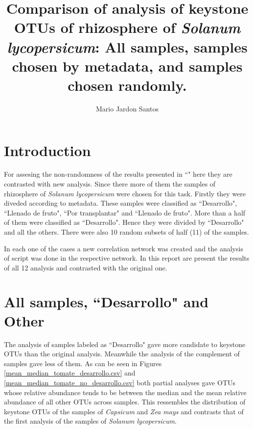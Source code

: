 \documentclass{article}
\title{Comparison of analysis of keystone OTUs of rhizosphere of \textit{Solanum lycopersicum}: All samples, samples chosen by metadata, and samples chosen randomly.}
\author{Mario Jardon Santos}
\date{}
\begin{document}
\maketitle

\section{Introduction}
\label{intro}

For assesing the non-randomness of the results presented in ``" here they are contrasted with new analysis. 
Since there more of them the samples of rhizosphere of \textit{Solanum lycopersicum} were chosen for this task.
Firstly they were diveded according to metadata. 
These samples were classified as ``Desarrollo", ``Llenado de fruto", ``Por transplantar" and ``Llenado de fruto".
More than a half of them were classified as ``Desarrollo".
Hence they were divided by ``Desarrollo" and all the others.
There were also 10 random subsets of half (11) of the samples.

In each one of the cases a new correlation network was created and the analysis of script was done in the respective network. 
In this report are present the results of all 12 analysis and contrasted with the original one.

\section{All samples, ``Desarrollo" and Other}
\label{des_vs_no_des}

The analysis of samples labeled as ``Desarrollo" gave more candidate to keystone OTUs  than the original analysis.
Meanwhile the analysis of the complement of samples gave less of them.
As can be seen in Figures \ref{mean_median_tomate_desarrollo.csv} and  \ref{mean_median_tomate_no_desarrollo.csv} both partial analyses gave OTUs whose relative abundance tends to be between the median and the mean relative abundance of all other OTUs across samples.
This ressembles the distribution of keystone OTUs of the samples of \textit{Capsicum} and \textit{Zea mays} and contrasts that of the first analysis of the samples of \textit{Solanum lycopersicum}.
\end{document}
